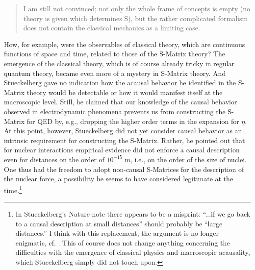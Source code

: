 \documentclass[12pt]{article}
\begin{document}
\begin{quote}
I am still not convinced; not only the whole frame of concepts is empty (no theory is given which determines S), but the rather complicated formalism does not contain the classical mechanics as a limiting case.
\end{quote}

How, for example, were the observables of classical theory, which are continuous functions of space and time, related to those of the S-Matrix theory? The emergence of the classical theory, which is of course already tricky in regular quantum theory, became even more of a mystery in S-Matrix theory. And Stueckelberg gave no indication how the acausal behavior he identified in the S-Matrix theory would be detectable or how it would manifest itself at the macroscopic level. Still, he claimed that our knowledge of the causal behavior observed in electrodynamic phenomena prevents us from constructing the S-Matrix for QED by, e.g., dropping the higher order terms in the expansion for $\eta$. At this point, however, Stueckelberg did not yet consider causal behavior as an intrinsic requirement for constructing the S-Matrix. Rather, he pointed out that for nuclear interactions empirical evidence did not enforce a causal description even for distances on the order of $10^{-15}$ m, i.e., on the order of the size of nuclei. One thus had the freedom to adopt non-causal S-Matrices for the description of the nuclear force, a possibility he seems to have considered legitimate at the time.\footnote{In Stueckelberg's Nature note there appears to be a misprint: ``...if we go back to a causal description at small distances'' should probably be ``large distances.'' I think with this replacement, the argument is no longer enigmatic, cf. \citep[p.96]{wanders_2009_stueckelberg}. This of course does not change anything concerning the difficulties with the emergence of classical physics and macroscopic acausality, which Stueckelberg simply did not touch upon.}
\end{document}
